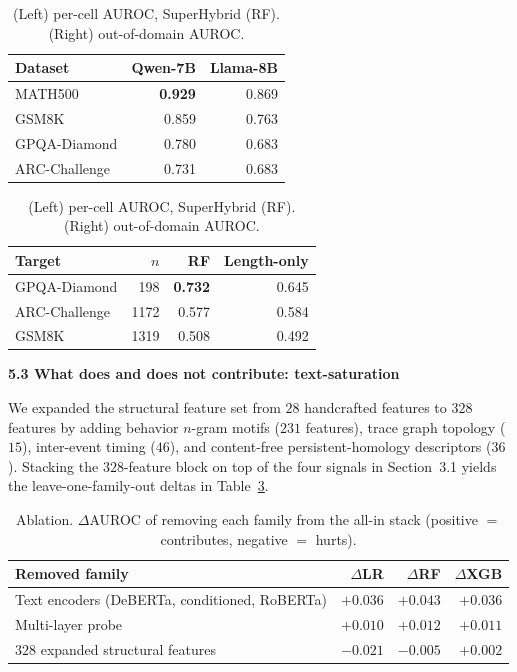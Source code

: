 \documentclass{article}
\begin{document}
\begin{table}[!htbp]
\scriptsize
\caption{(Left) per-cell AUROC, SuperHybrid (RF). (Right) out-of-domain AUROC.}
\label{tab:percell-transfer}
\centering
\footnotesize
\begin{minipage}[t]{0.46\textwidth}
\centering
\begin{tabular}{lrr}
\toprule
Dataset       & Qwen-7B         & Llama-8B \\
\midrule
MATH500       & \textbf{0.929}  & 0.869 \\
GSM8K         & 0.859           & 0.763 \\
GPQA-Diamond  & 0.780           & 0.683 \\
ARC-Challenge & 0.731           & 0.683 \\
\bottomrule
\end{tabular}
\end{minipage}\hfill
\begin{minipage}[t]{0.50\textwidth}
\centering
\begin{tabular}{lrrr}
\toprule
Target        & $n$  & RF              & Length-only \\
\midrule
GPQA-Diamond  &  198 & \textbf{0.732}  & 0.645 \\
ARC-Challenge & 1172 & 0.577           & 0.584 \\
GSM8K         & 1319 & 0.508           & 0.492 \\
\bottomrule
\end{tabular}
\end{minipage}
\end{table}

\textbf{5.3 What does and does not contribute: text-saturation}

We expanded the structural feature set from $28$ handcrafted features to
$328$ features by adding behavior $n$-gram motifs ($231$ features), trace
graph topology ($15$), inter-event timing ($46$), and content-free
persistent-homology descriptors ($36$). Stacking the $328$-feature block on
top of the four signals in Section~3.1 yields the leave-one-family-out
deltas in Table~\ref{tab:ablation}.

\begin{table}[!htbp]
\caption{Ablation. $\Delta$AUROC of removing each family from the all-in
stack (positive $=$ contributes, negative $=$ hurts).}
\label{tab:ablation}
\centering
\footnotesize
\begin{tabular}{lrrr}
\toprule
Removed family & $\Delta$LR & $\Delta$RF & $\Delta$XGB \\
\midrule
Text encoders (DeBERTa, conditioned, RoBERTa)    & \textbf{$+0.036$} & \textbf{$+0.043$} & \textbf{$+0.036$} \\
Multi-layer probe                                & $+0.010$         & $+0.012$         & $+0.011$         \\
$328$ expanded structural features               & \textbf{$-0.021$} & $-0.005$         & $+0.002$         \\
\bottomrule
\end{tabular}
\end{table}
\end{document}
